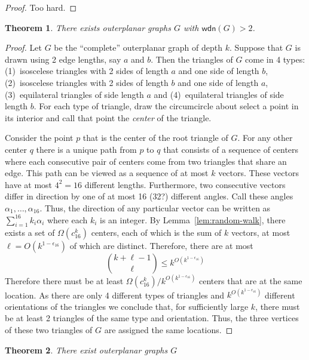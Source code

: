 \documentclass{article}
\newtheorem{thm}{Theorem}
\newcommand{\wdn}{\mathsf{wdn}}
\begin{document}
\begin{proof}
Too hard.
\end{proof}

\begin{thm}
There exists outerplanar graphs $G$ with $\wdn(G) > 2$.
\end{thm}

\begin{proof}
Let $G$ be the ``complete'' outerplanar graph of depth $k$.  Suppose
that $G$ is drawn using 2 edge lengths, say $a$ and $b$.  Then the
triangles of $G$ come in 4 types: (1)~isoscelese triangles with 2
sides of length $a$ and one side of length $b$, (2)~isoscelese
triangles with 2 sides of length $b$ and one side of length $a$,
(3)~equilateral triangles of side length $a$ and (4)~equilateral
triangles of side length $b$.  For each type of triangle, draw the
circumcircle about select a
point in its interior and call that point the \emph{center} of the
triangle.

Consider the point $p$ that is the center of the root triangle of $G$.
For any other center $q$ there is a unique path from $p$ to $q$ that
consists of a sequence of centers where each consecutive pair of
centers come from two triangles that share an edge.  This path can be
viewed as a sequence of at most $k$ vectors.  These vectors have at
most $4^2=16$ different lengths.  Furthermore, two consecutive vectors
differ in direction by one of at most 16 (32?) different angles.  Call
these angles $\alpha_1,\ldots,\alpha_{16}$.  Thus, the direction of
any particular vector can be written as $\sum_{i=1}^{16} k_i\alpha_i$
where each $k_i$ is an integer.  By Lemma~\ref{lem:random-walk}, there
exists a set of $\Omega(c_{16}^k)$ centers, each of which is the sum
of $k$ vectors, at most $\ell=O(k^{1-\epsilon_{16}})$ of which are
distinct.  Therefore, there are at most
\[
     {k+\ell-1 \choose \ell} \le k^{O(k^{1-\epsilon_{16}})}    
\]
Therefore there must be at least
$\Omega(c_{16}^k)/k^{O(k^{1-\epsilon_{16}})}$ centers that are at the
same location.  As there are only 4 different types of triangles and
$k^{O(k^{1-\epsilon_{16}})}$ different orientations of the triangles we
conclude that, for sufficiently large $k$, there must be at least 2
triangles of the same type and orientation.  Thus, the three vertices
of these two triangles of $G$ are assigned the same locations.
\end{proof}

\begin{thm}
There exist outerplanar graphs $G$
\end{thm}
\end{document}

